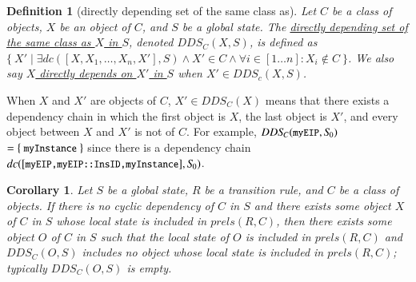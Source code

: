 \documentclass[12pt]{report}
\newtheorem{corollary}{Corollary}
\newtheorem{definition}{Definition}
\newcommand{\mbstt}[1]{\mbox{\small{\tt {#1}}}}
\newcommand{\ul}{\underline}
\begin{document}
\begin{definition}[directly depending set of the same class as]
Let $C$ be a class of objects, $X$ be an object of $C$, and $S$ be a
global state. The \ul{directly depending set of the same class as $X$
  in $S$}, denoted \ul{$DDS\!_C(X,S)$}, is defined as $\{~X'\mid\exists
dc([X,X_1,\dots,X_n,X'],S)\land X' \in C\land\forall i\in [1 \dots
  n]:X_i \not\in C~\}$. We also say \ul{$X$ directly depends on $X'$
  in $S$} when $X'\in DDS\!_c(X,S)$.
\end{definition}
When $X$ and $X'$ are objects of $C$, $X' \in DDS\!_C(X)$ means that
there exists a dependency chain in which the first object is $X$, the
last object is $X'$, and every object between $X$ and $X'$ is not of
$C$. For example, $DDS\!_C(\mbstt{myEIP},S\!_0)$ $=\{~\mbstt{myInstance}~\}$
since there is a dependency chain
$dc([\mbstt{myEIP,myEIP::InsID,myInstance}],S\!_0)$.

\begin{corollary}
Let $S$ be a global state, $R$ be a transition rule, and $C$ be a
class of objects. If there is no cyclic dependency of $C$ in $S$ and
there exists some object $X$ of $C$ in $S$ whose local state is
included in $prels(R,C)$, then there exists some object $O$ of $C$ in
$S$ such that the local state of $O$ is included in $prels(R,C)$ and
$DDS\!_C(O,S)$ includes no object whose local state is included in
$prels(R,C)$; typically $DDS\!_C(O,S)$ is empty.
\end{corollary}
\end{document}
